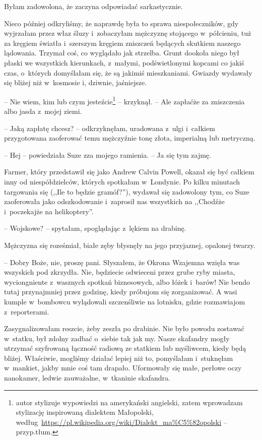 \documentclass[oneside,polish,11pt,sfheadings]{mwbk}
\begin{document}
Byłam zadowolona, że zaczyna odpowiadać sarkastycznie.

Nieco później odkryliśmy, że naprawdę była to sprawa niespołeczników,
gdy wyjrzałam przez właz śluzy i~zobaczyłam mężczyznę stojącego w~półcieniu, tuż za kręgiem światła i~szerszym kręgiem zniszczeń będących
skutkiem naszego lądowania. Trzymał coś, co wyglądało jak strzelba.
Grunt dookoła niego był płaski we wszystkich kierunkach, z~małymi,
podświetlonymi kopcami co jakiś czas, o~których domyślałam się, że są
jakimiś mieszkaniami. Gwiazdy wydawały się bliżej niż w~kosmosie i,
dziwnie, jaśniejsze.

-- Nie wiem, kim lub czym jesteźcie\footnote{ autor stylizuje wypowiedzi na
amerykański angielski, zatem wprowadzam stylizację inspirowaną dialektem
Małopolski, według~\url{https://pl.wikipedia.org/wiki/Dialekt\_ma\%C5\%82opolski}
-- przyp.tłum.} -- krzyknął. -- Ale zapłaćże za zniszczenia albo jasda z~mojej ziemi.

-- Jaką zapłatę chcesz? -- odkrzyknęłam, uradowana z~ulgi i~całkiem
przygotowana zaoferować temu mężczyźnie tonę złota, imperialną lub
metryczną.

-- Hej -- powiedziała Suze zza mojego ramienia. -- Ja się tym zajmę.

Farmer, który przedstawił się jako Andrew Calvin Powell, okazał się być
całkiem inny od niespółdzielców, których spotkałam w~Londynie. Po kilku
minutach targowania się (,,Ile to będzie gramóf?''), wydawał się
zadowolony tym, co Suze zaoferowała jako odszkodowanie i~zaprosił nas
wszystkich na ,,Chodźże i~poczekajże na helikoptery''.

-- Wojskowe? -- spytałam, spoglądając z~lękiem na drabinę.

Mężczyzna się roześmiał, białe zęby błysnęły na jego przyjaznej,
opalonej twarzy. 

-- Dobry Boże, nie, proszę pani. Słyszałem, że Okrona
Wzajemna wzięła was wszyskich pod zkrzydła. Nie, będziecie odwieceni
przez grube ryby miasta, wyciongniente z~wasznych spotkań biznesowych,
albo łóżek i~barów! Nie bendo tutaj przynajmniej przez godzinę, kiedy
próbujom się zorganizować. A wasi kumple w~bombowcu wylądowali
szczenśliwie na lotnisku, gdzie rozmawiajom z~reporterami.

Zasygnalizowałam reszcie, żeby zeszła po drabinie. Nie było powodu
zostawać w~statku, był zdolny zadbać o~siebie tak jak my. Nasze
skafandry mogły utrzymać szyfrowaną łączność radiową ze statkiem lub
myśliwcem, kiedy będą bliżej. Właściwie, mogliśmy działać lepiej niż to,
pomyślałam i~stuknęłam w~mankiet, jakby mnie coś tam drapało. Uformowały
się małe, perłowe oczy nanokamer, ledwie zauważalne, w~tkaninie
skafandra.
\end{document}

